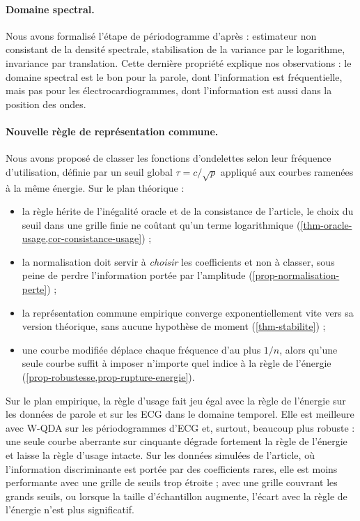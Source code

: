 \paragraph{Domaine spectral.} Nous avons formalisé l'étape de périodogramme d'après \citet{shumway2011time} : estimateur non consistant de la densité spectrale, stabilisation de la variance par le logarithme, invariance par translation. Cette dernière propriété explique nos observations : le domaine spectral est le bon pour la parole, dont l'information est fréquentielle, mais pas pour les électrocardiogrammes, dont l'information est aussi dans la position des ondes.

\paragraph{Nouvelle règle de représentation commune.} Nous avons proposé de classer les fonctions d'ondelettes selon leur fréquence d'utilisation, définie par un seuil global $\tau=c/\sqrt p$ appliqué aux courbes ramenées à la même énergie. Sur le plan théorique :
\begin{itemize}
  \item la règle hérite de l'inégalité oracle et de la consistance de l'article, le choix du seuil dans une grille finie ne coûtant qu'un terme logarithmique (\cref{thm-oracle-usage,cor-consistance-usage}) ;
  \item la normalisation doit servir à \emph{choisir} les coefficients et non à classer, sous peine de perdre l'information portée par l'amplitude (\cref{prop-normalisation-perte}) ;
  \item la représentation commune empirique converge exponentiellement vite vers sa version théorique, sans aucune hypothèse de moment (\cref{thm-stabilite}) ;
  \item une courbe modifiée déplace chaque fréquence d'au plus $1/n$, alors qu'une seule courbe suffit à imposer n'importe quel indice à la règle de l'énergie (\cref{prop-robustesse,prop-rupture-energie}).
\end{itemize}
Sur le plan empirique, la règle d'usage fait jeu égal avec la règle de l'énergie sur les données de parole et sur les ECG dans le domaine temporel. Elle est meilleure avec W-QDA sur les périodogrammes d'ECG et, surtout, beaucoup plus robuste : une seule courbe aberrante sur cinquante dégrade fortement la règle de l'énergie et laisse la règle d'usage intacte. Sur les données simulées de l'article, où l'information discriminante est portée par des coefficients rares, elle est moins performante avec une grille de seuils trop étroite ; avec une grille couvrant les grands seuils, ou lorsque la taille d'échantillon augmente, l'écart avec la règle de l'énergie n'est plus significatif.

